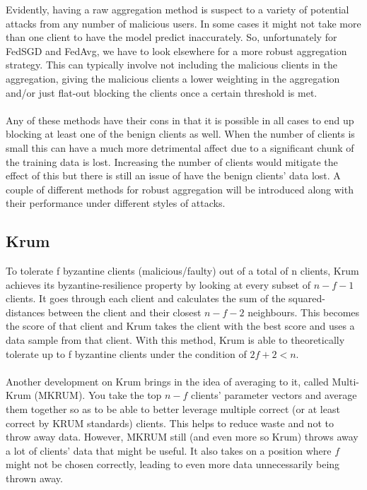 Evidently, having a raw aggregation method is suspect to a variety of potential attacks from any number of malicious users. In some cases it might not take more than one client to have the model predict inaccurately. So, unfortunately for FedSGD and FedAvg, we have to look elsewhere for a more robust aggregation strategy. This can typically involve not including the malicious clients in the aggregation, giving the malicious clients a lower weighting in the aggregation and/or just flat-out blocking the clients once a certain threshold is met. \\ \\
Any of these methods have their cons in that it is possible in all cases to end up blocking at least one of the benign clients as well. 
When the number of clients is small this can have a much more detrimental affect due to a significant chunk of the training data is lost. 
Increasing the number of clients would mitigate the effect of this but there is still an issue of have the benign clients' data lost. 
A couple of different methods for robust aggregation will be introduced along with their performance under different styles of attacks.

\subsection{Krum}
To tolerate f byzantine clients (malicious/faulty) out of a total of n clients, Krum \cite{krum} achieves its byzantine-resilience property by looking at every subset of $n-f-1$ clients. 
It goes through each client and calculates the sum of the squared-distances between the client and their closest $n-f-2$ neighbours.
This becomes the score of that client and Krum takes the client with the best score and uses a data sample from that client.
With this method, Krum is able to theoretically tolerate up to f byzantine clients under the condition of $2f + 2 < n$. 
\\ \\
Another development on Krum brings in the idea of averaging to it, called Multi-Krum (MKRUM).
You take the top $n-f$ clients' parameter vectors and average them together so as to be able to better leverage multiple correct (or at least correct by KRUM standards) clients.
This helps to reduce waste and not to throw away data. However, MKRUM still (and even more so Krum) throws away a lot of clients' data that might be useful. It also takes on a position where $f$ might not be chosen correctly, leading to even more data unnecessarily being thrown away.

